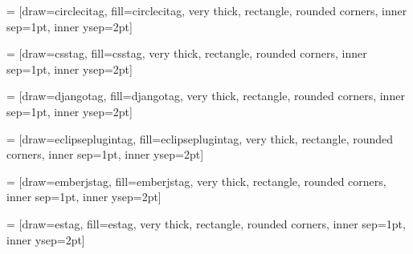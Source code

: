  = [draw=circlecitag, fill=circlecitag, very thick, rectangle, rounded corners, inner sep=1pt, inner ysep=2pt]
\newcommand{\circlecitag}{\begin{tikzpicture}\node [circlecitag] (box){{\scriptsize \textbf{\phantom{|}CircleCI\phantom{|}}}};\end{tikzpicture}}
\usepackage{tikz}
    
 = [draw=csstag, fill=csstag, very thick, rectangle, rounded corners, inner sep=1pt, inner ysep=2pt]
\newcommand{\csstag}{\begin{tikzpicture}\node [csstag] (box){{\scriptsize \textbf{\phantom{|}CSS\phantom{|}}}};\end{tikzpicture}}
\usepackage{tikz}
    
 = [draw=djangotag, fill=djangotag, very thick, rectangle, rounded corners, inner sep=1pt, inner ysep=2pt]
\newcommand{\djangotag}{\begin{tikzpicture}\node [djangotag] (box){{\scriptsize \color{white}{\textbf{\phantom{|}Django\phantom{|}}}}};\end{tikzpicture}}
\usepackage{tikz}
    
 = [draw=eclipseplugintag, fill=eclipseplugintag, very thick, rectangle, rounded corners, inner sep=1pt, inner ysep=2pt]
\newcommand{\eclipseplugintag}{\begin{tikzpicture}\node [eclipseplugintag] (box){{\scriptsize \textbf{\phantom{|}Plugin Eclipse\phantom{|}}}};\end{tikzpicture}}
\usepackage{tikz}
    
 = [draw=emberjstag, fill=emberjstag, very thick, rectangle, rounded corners, inner sep=1pt, inner ysep=2pt]
\newcommand{\emberjstag}{\begin{tikzpicture}\node [emberjstag] (box){{\scriptsize \color{white}{\textbf{\phantom{|}EmberJS\phantom{|}}}}};\end{tikzpicture}}
\usepackage{tikz}
    
 = [draw=estag, fill=estag, very thick, rectangle, rounded corners, inner sep=1pt, inner ysep=2pt]
\newcommand{\estag}{\begin{tikzpicture}\node [estag] (box){{\scriptsize \textbf{\phantom{|}ElasticSearch\phantom{|}}}};\end{tikzpicture}}
\usepackage{tikz}
    
